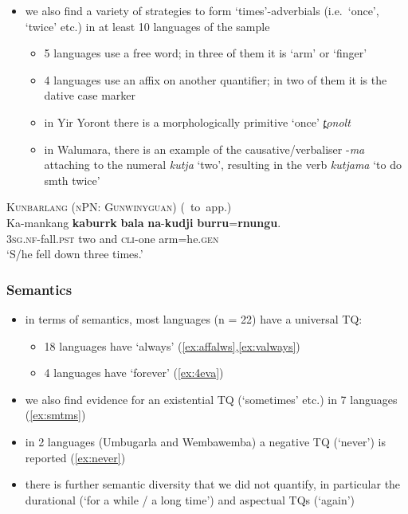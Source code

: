 \documentclass{article}
\begin{document}
\begin{itemize}
\item we also find a variety of strategies to form `times'-adverbials (i.e.\ `once', `twice' etc.) in at least 10 languages of the sample
  \begin{itemize}
  \item 5 languages use a free word; in three of them it is `arm' or `finger' %
  \item 4 languages use an affix on another quantifier; in two of them it is the dative case marker %
  \item in Yir Yoront there is a morphologically primitive `once' \textit{\charis t̪onolt}
  \item in Walumara, there is an example of the causative/verbaliser -\textit{\charis ma} attaching to the numeral \textit{\charis kutja} `two', resulting in the verb \textit{\charis kutjama} `to do smth twice' %
  \end{itemize}
\end{itemize}
\begin{exe}
  \ex\label{ex:2arm} \textsc{Kunbarlang (nPN: Gunwinyguan)} (\citealt{ikthesis}~to~app.)\\
  \gll Ka-mankang \textbf{kaburrk} \textbf{bala} \textbf{na}-\textbf{kudji} \textbf{burru}=\textbf{rnungu}.\\
  \textsc{3sg.nf}-fall.\textsc{pst} two and \textsc{cli}-one arm=he.\textsc{gen}\\
  \glt `S/he fell down three times.' %
\end{exe}

\subsubsection{Semantics}
\label{sec:tqsem}
\begin{itemize}
\item in terms of semantics, most languages (n = 22) have a universal TQ:
  \begin{itemize}
  \item 18 languages have `always' (\ref{ex:affalws},\ref{ex:valways})
  \item 4 languages have `forever' (\ref{ex:4eva})
  \end{itemize}
\item we also find evidence for an existential TQ (`sometimes' etc.) in 7 languages (\ref{ex:smtms})
\item in 2 languages (Umbugarla and Wembawemba) a negative TQ (`never') is reported (\ref{ex:never})
\item there is further semantic diversity that we did not quantify, in particular the durational (`for a while / a long time') and aspectual TQs (`again')
\end{itemize}
\end{document}
